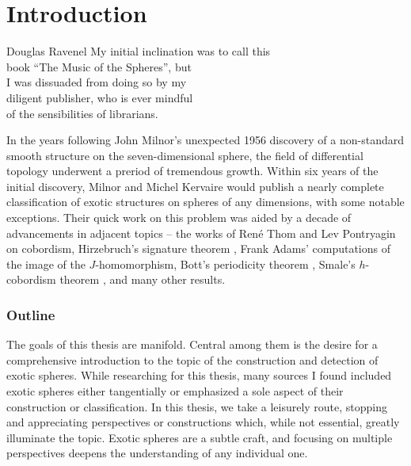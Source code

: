 \chapter{Introduction}\label{chap:introduction}

\begin{epigraph}{17em}{Douglas Ravenel}
  My initial inclination was to call this\\
  book ``The Music of the Spheres'', but\\
  I was dissuaded from doing so by my \\
  diligent publisher, who is ever mindful \\
  of the sensibilities of librarians.
\end{epigraph}

In the years following John Milnor's unexpected 1956 discovery \cite{milnor1956manifolds} of a non-standard smooth structure on the seven-dimensional sphere, the field of differential topology underwent a preriod of tremendous growth. Within six years of the initial discovery, Milnor and Michel Kervaire would publish a nearly complete classification of exotic structures on spheres of any dimensions, with some notable exceptions. 
Their quick work on this problem was aided by a decade of advancements in adjacent topics -- the works of Ren\'e Thom \cite{thom1954} and Lev Pontryagin \cite{pontryagin1959homotopy} on cobordism, Hirzebruch's signature theorem \cite{hirzebruch1966methods}, Frank Adams' computations of the image of the $J$-homomorphism, Bott's periodicity theorem \cite{bott1959stable}, Smale's $h$-cobordism theorem \cite{smale1961generalized}, and many other results. 

\subsection*{Outline}

The goals of this thesis are manifold. Central among them is the desire for a comprehensive introduction to the topic of the construction and detection of exotic spheres. While researching for this thesis, many sources I found included exotic spheres either tangentially or emphasized a sole aspect of their construction or classification. In this thesis, we take a leisurely route, stopping and appreciating perspectives or constructions which, while not essential, greatly illuminate the topic. Exotic spheres are a subtle craft, and focusing on multiple perspectives deepens the understanding of any individual one. 
%


